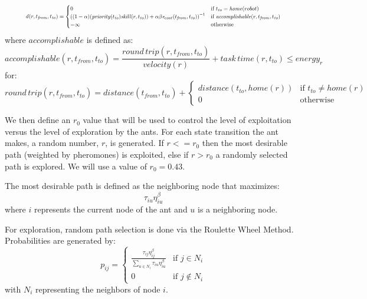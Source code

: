 \documentclass[a4paper]{article}
\begin{document}
\begin{equation*}
\resizebox{0.9\textwidth}{!}{$
\mathit{d}(r, t_\mathit{from}, t_\mathit{to}) = \begin{cases}
  0 & \text{if } t_\mathit{to} = \mathit{home}(robot) \\
  \left(
  (1 - \alpha)
    (\mathit{priority}(t_\mathit{to}) \mathit{skill}(r, t_\mathit{to})) +
    \alpha \beta
    \mathit{e}_{cost}(t_\mathit{from}, t_\mathit{to})
  \right)^{-1}
  & \text{if }\mathit{accomplishable}(r, t_\mathit{from}, t_\mathit{to}) \\
  - \infty
  & \text{otherwise} \\
\end{cases}
$}
\end{equation*}
where $\mathit{accomplishable}$ is defined as:
$$
\mathit{accomplishable}(r, t_\mathit{from}, t_\mathit{to}) =
\frac{\mathit{round\,trip}(r, t_\mathit{from}, t_\mathit{to})}{velocity(r)} + \mathit{task \, time}(r, t_\mathit{to}) \leq \mathit{energy}_r
$$
for:
$$
\mathit{round\,trip}(r, t_\mathit{from}, t_\mathit{to}) = \mathit{distance}(t_\mathit{from}, t_\mathit{to}) + \begin{cases}
\mathit{distance}(t_\mathit{to}, \mathit{home}(r)) & \text{if } t_\mathit{to} \ne \mathit{home}(r) \\
0 & \text{otherwise}
\end{cases}
$$

We then define an $r_0$ value that will be used to control the level of exploitation versus the level of exploration by the ants.
For each state transition the ant makes, a random number, $r$, is generated.
If $r<=r_0$ then the most desirable path (weighted by pheromones) is exploited, else if $r>r_0$
a randomly selected path is explored. We will use a value of $r_0=0.43$.

The most desirable path is defined as the neighboring node that maximizes:
$$
\tau_{iu}\eta_{iu}^\beta
$$
where $i$ represents the current node of the ant and $u$ is a neighboring node.

For exploration, random path selection is done via the Roulette Wheel Method.
Probabilities are generated by:
$$
p_{ij}=
\begin{cases}
\frac{\tau_{ij}\eta_{ij}^\beta}{\sum\limits_{u\in N_i} \tau_{iu}\eta_{iu}^\beta} & \text{if } j \in N_i\\
0 & \text{if } j \not\in N_i
\end{cases}
$$
with $N_i$ representing the neighbors of node $i$.
\end{document}
